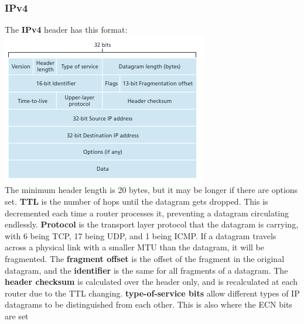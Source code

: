 \subsubsection{IPv4}
The \textbf{IPv4} header has this format:
\includegraphics[width=\linewidth]{../images/w7n3ipv4Datagram.png}\\
The minimum header length is 20 bytes, but it may be longer if there are options set. \textbf{TTL} is the number of hops until the datagram gets dropped. This is decremented each time a router processes it, preventing a datagram circulating endlessly. \textbf{Protocol} is the transport layer protocol that the datagram is carrying, with 6 being TCP, 17 being UDP, and 1 being ICMP. If a datagram travels across a physical link with a smaller MTU than the datagram, it will be fragmented. The \textbf{fragment offset} is the offset of the fragment in the original datagram, and the \textbf{identifier} is the same for all fragments of a datagram. The \textbf{header checksum} is calculated over the header only, and is recalculated at each router due to the TTL changing. \textbf{type-of-service bits} allow different types of IP datagrams to be distinguished from each other. This is also where the ECN bits are set\\
